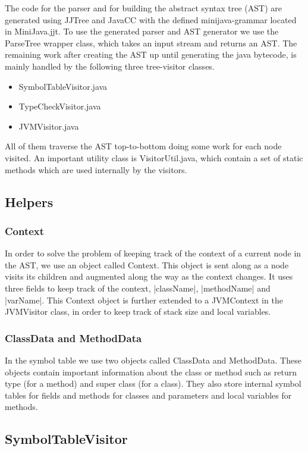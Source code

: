 \documentclass[paper=a4, fontsize=11pt]{scrartcl} %
\numberwithin{equation}{section} %
\numberwithin{figure}{section} %
\numberwithin{table}{section} %
\begin{document}
The code for the parser and for building the abstract syntax tree (AST) are generated using JJTree and JavaCC with the defined minijava-grammar located in MiniJava.jjt.
To use the generated parser and AST generator we use the ParseTree wrapper class, which takes an input stream and returns an AST.
The remaining work after creating the AST up until generating the java bytecode, is mainly handled by the following three tree-visitor classes.
\begin{itemize}
  \item{SymbolTableVisitor.java}
  \item{TypeCheckVisitor.java}
  \item{JVMVisitor.java}
\end{itemize}
All of them traverse the AST top-to-bottom doing some work for each node visited.
An important utility class is VisitorUtil.java, which contain a set of static methods which are used internally by the visitors.

\subsection{Helpers}

\subsubsection*{Context}

In order to solve the problem of keeping track of the context of a current node in the AST, we use an object called Context.
This object is sent along as a node visits its children and augmented along the way as the context changes.
It uses three fields to keep track of the context, |className|, |methodName| and |varName|.
This Context object is further extended to a JVMContext in the JVMVisitor class, in order to keep track of stack size and local variables.

\subsubsection*{ClassData and MethodData}

In the symbol table we use two objects called ClassData and MethodData.
These objects contain important information about the class or method such as return type (for a method) and super class (for a class).
They also store internal symbol tables for fields and methods for classes and parameters and local variables for methods.

\subsection{SymbolTableVisitor}
\end{document}
